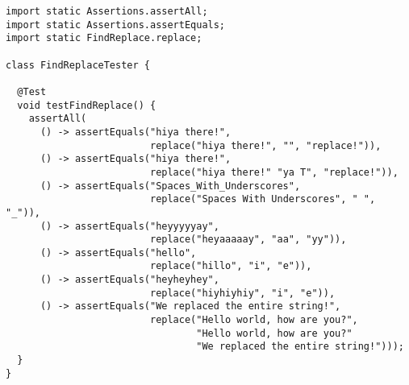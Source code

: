 
\begin{lstlisting}[language=MyJava]
import static Assertions.assertAll;
import static Assertions.assertEquals;
import static FindReplace.replace;

class FindReplaceTester {

  @Test
  void testFindReplace() {
    assertAll(
      () -> assertEquals("hiya there!",
                         replace("hiya there!", "", "replace!")),
      () -> assertEquals("hiya there!",
                         replace("hiya there!" "ya T", "replace!")),
      () -> assertEquals("Spaces_With_Underscores",
                         replace("Spaces With Underscores", " ", "_")),
      () -> assertEquals("heyyyyyay",
                         replace("heyaaaaay", "aa", "yy")),
      () -> assertEquals("hello",
                         replace("hillo", "i", "e")),
      () -> assertEquals("heyheyhey",
                         replace("hiyhiyhiy", "i", "e")),
      () -> assertEquals("We replaced the entire string!",
                         replace("Hello world, how are you?", 
                                 "Hello world, how are you?" 
                                 "We replaced the entire string!")));
  }
}
\end{lstlisting}

